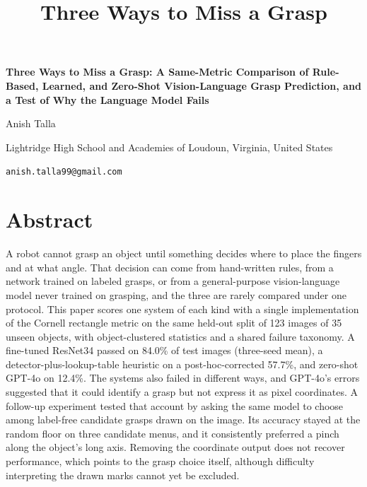 \documentclass[12pt,letterpaper]{article}
\title{Three Ways to Miss a Grasp}
\begin{document}

\begin{center}
{\Large\bfseries Three Ways to Miss a Grasp: A Same-Metric Comparison of
Rule-Based, Learned, and Zero-Shot Vision-Language Grasp Prediction, and a
Test of Why the Language Model Fails\par}
\vspace{0.2in}
{\large Anish Talla\par}
{Lightridge High School and Academies of Loudoun, Virginia, United States\par}
{\texttt{anish.talla99@gmail.com}\par}
\end{center}
\vspace{0.2in}
\section*{Abstract}

A robot cannot grasp an object until something decides where to place
the fingers and at what angle. That decision can come from hand-written
rules, from a network trained on labeled grasps, or from a
general-purpose vision-language model never trained on grasping, and the
three are rarely compared under one protocol. This paper scores one
system of each kind with a single implementation of the Cornell
rectangle metric on the same held-out split of 123 images of 35 unseen
objects, with object-clustered statistics and a shared failure taxonomy.
A fine-tuned ResNet34 passed on 84.0\% of test images (three-seed mean),
a detector-plus-lookup-table heuristic on a post-hoc-corrected 57.7\%,
and zero-shot GPT-4o on 12.4\%. The systems also failed in different
ways, and GPT-4o's errors suggested that it could identify a grasp but
not express it as pixel coordinates. A follow-up experiment tested that
account by asking the same model to choose among label-free candidate
grasps drawn on the image. Its accuracy stayed at the random floor on
three candidate menus, and it consistently preferred a pinch along the
object's long axis. Removing the coordinate output does not recover
performance, which points to the grasp choice itself, although
difficulty interpreting the drawn marks cannot yet be excluded.
\end{document}
